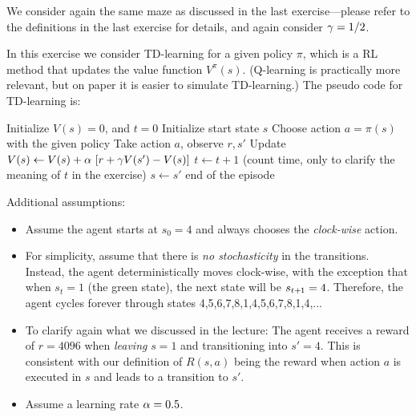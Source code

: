 

\renewcommand{\course}{Artificial Intelligence}
\renewcommand{\coursepicture}{course_ai}
\renewcommand{\coursedate}{Summer 2026}

\renewcommand{\exnum}{Exercise 6}

\exercises
\exercisestitle




We consider again the same maze as discussed in the last exercise---please refer to the definitions in the last exercise for details, and again consider $\gamma=1/2$.

In this exercise we consider TD-learning for a given policy $\pi$, which
is a RL method that updates the value function $V^\pi(s)$. (Q-learning
is practically more relevant, but on paper it is easier to simulate
TD-learning.) The pseudo code for TD-learning is:\\
\begin{algo}
\State Initialize $V(s)=0$, and $t=0$
\State Initialize start state $s$
\Repeat {}
\State Choose action $a = \pi(s)$ with the given policy
\State Take action $a$, observe $r, s'$
\State Update $V(s) \gets V(s) + \alpha~ [r + \gamma V(s') - V(s)]$ \label{stepUp}
\State $t\gets t+1$ (count time, only to clarify the meaning of $t$ in the exercise)
\State $s\gets s'$
\Until end of the episode
\end{algo}

Additional assumptions:
\begin{itemize}
\item Assume the agent starts at $s_0=4$ and always chooses the \emph{clock-wise} action.

\item For simplicity, assume that there is \emph{no stochasticity} in the transitions. Instead, the agent deterministically moves clock-wise, with the exception that when $s_t=1$ (the green state), the next state will be $s_{t{{\hspace*{-.0pt}\text{\rm +}\hspace*{-.5pt}}1}}=4$. Therefore, the agent cycles forever through states 4,5,6,7,8,1,4,5,6,7,8,1,4,...

\item To clarify again what we discussed in the lecture:
The agent receives a reward of $r=4096$ when \emph{leaving} $s=1$ and transitioning into $s'=4$. This is consistent with our definition of $R(s,a)$ being the reward when action $a$ is executed in $s$ and leads to a transition to $s'$.

\item Assume a learning rate $\alpha=0.5$.
\end{itemize}

